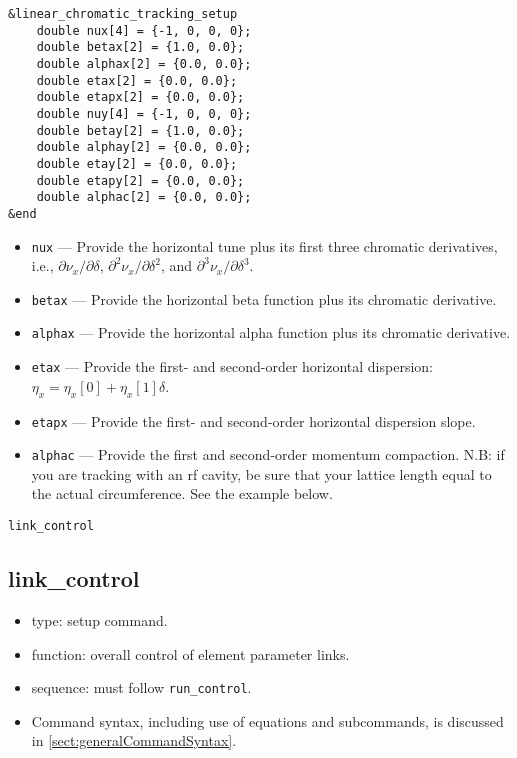 \documentclass[11pt]{article}
\begin{document}
\begin{verbatim}
&linear_chromatic_tracking_setup
    double nux[4] = {-1, 0, 0, 0};
    double betax[2] = {1.0, 0.0};
    double alphax[2] = {0.0, 0.0};
    double etax[2] = {0.0, 0.0};
    double etapx[2] = {0.0, 0.0};
    double nuy[4] = {-1, 0, 0, 0};
    double betay[2] = {1.0, 0.0};
    double alphay[2] = {0.0, 0.0};
    double etay[2] = {0.0, 0.0};
    double etapy[2] = {0.0, 0.0};
    double alphac[2] = {0.0, 0.0};
&end
\end{verbatim}

\begin{itemize}
\item \verb|nux| --- Provide the horizontal tune plus its first three chromatic derivatives, i.e.,
  $\partial \nu_x/\partial\delta$, $\partial^2 \nu_x/\partial\delta^2$, and
  $\partial^3 \nu_x/\partial\delta^3$.
\item \verb|betax| --- Provide the horizontal beta function plus its chromatic derivative.
\item \verb|alphax| --- Provide the horizontal alpha function plus its chromatic derivative.
\item \verb|etax| --- Provide the first- and second-order horizontal dispersion:
  $\eta_x = \eta_x\left[0\right] + \eta_x\left[1\right]\delta$.
\item \verb|etapx| --- Provide the first- and second-order horizontal dispersion slope.
\item \verb|alphac| --- Provide the first and second-order momentum compaction.  N.B: if you are tracking
 with an rf cavity, be sure that your lattice length equal to the actual circumference.  See the example below.
\end{itemize}

\newpage
\begin{center}{\Large\verb|link_control|}\end{center}
\subsection{link\_control \label{subsec:linkcontrol}}

\begin{itemize}
\item type: setup command.
\item function: overall control of element parameter links.
\item sequence: must follow \verb|run_control|.
\item Command syntax, including use of equations and subcommands, is discussed in \ref{sect:generalCommandSyntax}.
\end{itemize}
\end{document}
